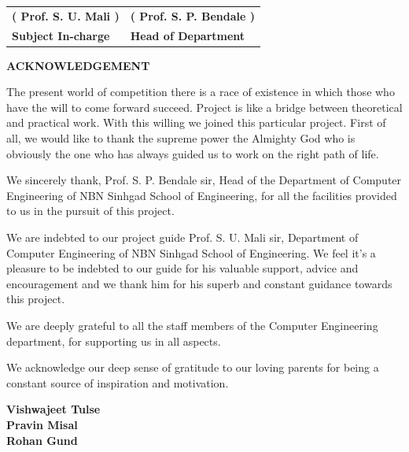 \documentclass[12pt,a4paper]{article}
\begin{document}
\begin{tabular}{p{7cm}p{7cm}}
\textbf{( Prof. S. U. Mali )} & \textbf{( Prof. S. P. Bendale )}\\[0.3cm]
\textbf{Subject In-charge} & \textbf{Head of Department}\\
\end{tabular}
\newpage

\thispagestyle{empty}
\begin{center}{\large\bfseries ACKNOWLEDGEMENT}\end{center}
\vspace{0.5cm}
The present world of competition there is a race of existence in which those who have the will to come forward succeed. Project is like a bridge between theoretical and practical work. With this willing we joined this particular project. First of all, we would like to thank the supreme power the Almighty God who is obviously the one who has always guided us to work on the right path of life.

We sincerely thank, Prof. S. P. Bendale sir, Head of the Department of Computer Engineering of NBN Sinhgad School of Engineering, for all the facilities provided to us in the pursuit of this project.

We are indebted to our project guide Prof. S. U. Mali sir, Department of Computer Engineering of NBN Sinhgad School of Engineering. We feel it's a pleasure to be indebted to our guide for his valuable support, advice and encouragement and we thank him for his superb and constant guidance towards this project.

We are deeply grateful to all the staff members of the Computer Engineering department, for supporting us in all aspects.

We acknowledge our deep sense of gratitude to our loving parents for being a constant source of inspiration and motivation.
\vspace{1.5cm}

\begin{flushright}
\textbf{Vishwajeet Tulse}\\
\textbf{Pravin Misal}\\
\textbf{Rohan Gund}
\end{flushright}
\newpage
\end{document}
